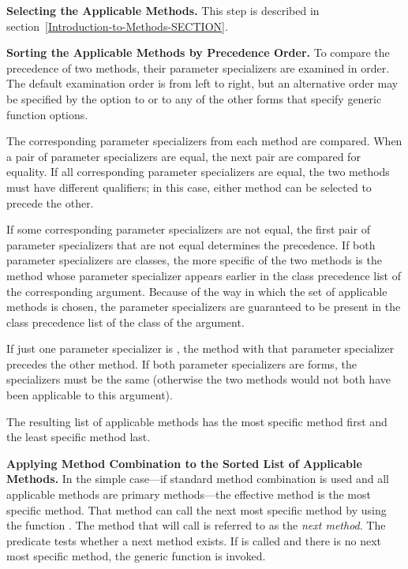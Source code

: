 \textbf{Selecting the Applicable Methods.}
This step is described in section~\ref{Introduction-to-Methods-SECTION}.


\textbf{Sorting the Applicable Methods by Precedence Order.}
To compare the precedence of two methods, their parameter specializers
are examined in order.  The default examination order is from left to
right, but an alternative order may be specified by the 
 option to  or to any of
the other forms that specify generic function options.

The corresponding parameter specializers from each method are
compared.  When a pair of parameter specializers are equal, the next
pair are compared for equality.  If all corresponding parameter
specializers are equal, the two methods must have different
qualifiers; in this case, either method can be selected to precede the
other.

If some corresponding parameter specializers are not equal, the first
pair of parameter specializers that are not equal determines the
precedence.  If both parameter specializers are classes, the more
specific of the two methods is the method whose parameter specializer
appears earlier in the class precedence list of the corresponding
argument.  Because of the way in which the set of applicable methods
is chosen, the parameter specializers are guaranteed to be present in
the class precedence list of the class of the argument.

If just one parameter specializer is , the method with that parameter specializer precedes the
other method.  If both parameter specializers are 
forms, the
specializers must be the same (otherwise the two methods would
not both have been applicable to this argument).

The resulting list of applicable methods has the most specific
method first and the least specific method last.    

\textbf{Applying Method Combination to the Sorted List of Applicable Methods.}
In the simple case---if standard method combination is used and all
applicable methods are primary methods---the effective method is the
most specific method.  That method can call the next most specific
method by using the function .  The method that
 will call is referred to as the \emph{next
method}.  The predicate  tests whether a next
method exists.  If  is called and there is no
next most specific method, the generic function 
is invoked.

